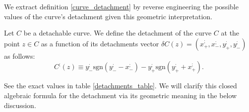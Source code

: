 \documentclass[11pt]{book}
\begin{document}
We extract definition \ref{curve_detachment} by reverse engineering the possible values
of the curve's detachment given this geometric interpretation.

\begin{definition}
Let $C$ be a detachable curve. We
define the detachment of the curve $C$ at the point $z\in C$ as
a function of its detachments vector $\delta C\left(z\right)=\left(x^;_+,x^;_-,y^;_+,y^;_-\right)$
as follows:
$$C^{;}\left(z\right)\equiv y_{-}^{;}\text{sgn}\left(y_{-}^{;}-x_{-}^{;}\right)-y_{+}^{;}\text{sgn}\left(y_{+}^{;}+x_{+}^{;}\right).$$

\label{curve_detachment}
\end{definition}
See the exact values in table \ref{detachments_table}. We will clarify this closed algebraic formula for the detachment via its geometric meaning in the below discussion.
\end{document}

